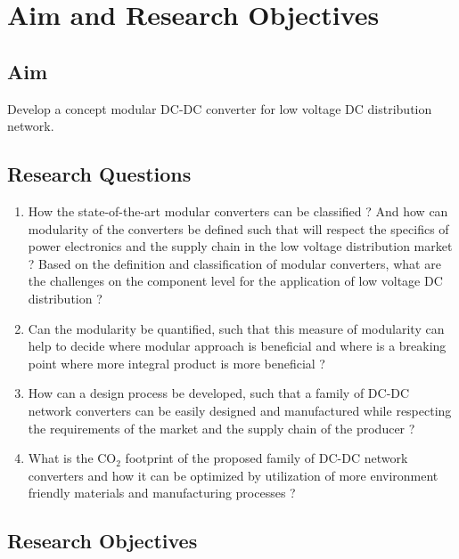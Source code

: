 \documentclass[]{scrreprt}
\begin{document}
\chapter{Aim and Research Objectives}

\section{Aim} Develop a concept modular DC-DC converter for low voltage DC distribution network.
 
 \vspace{10mm}

\section{Research Questions}

\begin{enumerate}
	\item How the state-of-the-art modular converters can be classified ? And how can modularity of the converters be defined such that will respect the specifics of power electronics and the supply chain in the low voltage distribution market ? 
	\subitem Based on the definition and classification of modular converters, what are the challenges on the component level for the application of low voltage DC distribution ?
	\item Can the modularity be quantified, such that this measure of modularity can help to decide where modular approach is beneficial and where is a breaking point where more integral product is more beneficial ?
	\item How can a design process be developed, such that a family of DC-DC network converters can be easily designed and manufactured while respecting the requirements of the market and the supply chain of the producer ? 
	\item What is the $\text{CO}_2$ footprint of the proposed family of DC-DC network converters and how it can be optimized by utilization of more environment friendly materials and manufacturing processes ? 
\end{enumerate}


\section{Research Objectives}
\end{document}

